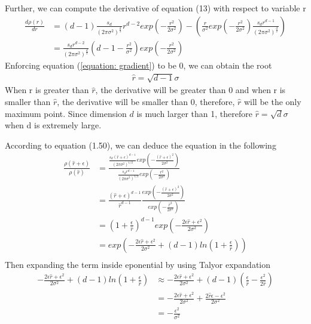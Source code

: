 \documentclass{article} %
\begin{document}
Further, we can compute the derivative of equation (13) with respect to variable r
\begin{equation}
    \begin{split}
    \frac{d\rho(r)}{d r} &= (d-1)\frac{s_d}{(2\pi\sigma^2)^{\frac{d}{2}}}r^{d-2}exp(-\frac{r^2}{2\sigma^2})-(\frac{r}{\sigma^2}exp(-\frac{r^2}{2\sigma^2})\frac{s_d r^{d-1}}{(2\pi\sigma^2)^{\frac{d}{2}}})\\
    &=\frac{s_d r^{d-2}}{(2\pi\sigma^2)^{\frac{d}{2}}}(d-1-\frac{r^2}{\sigma^2})exp(-\frac{r^2}{2\sigma^2})
    \end{split}
    \label{equation: gradient}
\end{equation}
Enforcing equation (\ref{equation: gradient}) to be 0, we can obtain the root
\begin{equation}
\begin{split}
    \hat{r} = \sqrt{d-1}\sigma
\end{split}
\end{equation}
When r is greater than $\hat{r}$, the derivative will be greater than 0 and when r is smaller than $\hat{r}$, the derivative will be smaller than 0, therefore, $\hat{r}$ will be the only maximum point.
Since dimension $d$ is much larger than 1, therefore $\hat{r}=\sqrt{d}\sigma$ when d is extremely large.
\par
According to equation (1.50), we can deduce the equation in the following
\begin{equation}
\begin{split}
    \frac{\rho(\hat{r}+\epsilon)}{\rho(\hat{r})}
    & = \frac{\frac{s_{d}(\hat{r}+\epsilon)^{d-1}}{(2\pi\sigma^2)^{1/2}}exp(-\frac{(\hat{r}+\epsilon)^2}{2\sigma^2})}{\frac{s_{d}r^{d-1}}{(2\pi\sigma^2)^{1/2}}exp(-\frac{r^2}{2\sigma^2})} \\
    &= \frac{(\hat{r}+\epsilon)^{d-1}}{\hat{r}^{d-1}}\frac{exp(-\frac{(\hat{r}+\epsilon)^2}{2\sigma^2})}{exp(-\frac{\hat{r}^2}{2\sigma^2})} \\
    &=(1+\frac{\epsilon}{\hat{r}})^{d-1}exp(-\frac{2\epsilon\hat{r}+\epsilon^2}{2\sigma^2})\\
    &=exp(-\frac{2\epsilon\hat{r}+\epsilon^2}{2\sigma^2}+(d-1)ln(1+\frac{\epsilon}{\hat{r}}))\\
\end{split}
\end{equation}
Then expanding the term inside eponential by using Talyor expandation
\begin{equation}
    \begin{split}
    -\frac{2\epsilon\hat{r}+\epsilon^2}{2\sigma^2}+(d-1)ln(1+\frac{\epsilon}{\hat{r}})&\approx-\frac{2\epsilon\hat{r}+\epsilon^2}{2\sigma^2}+(d-1)(\frac{\epsilon}{\hat{r}}-\frac{\epsilon^2}{2\hat{r}})\\
    &=-\frac{2\epsilon\hat{r}+\epsilon^2}{2\sigma^2}+\frac{2\hat{r}\epsilon-\epsilon^2}{2\sigma^2}\\
    &=-\frac{\epsilon^2}{\sigma^2}
    \end{split}
\end{equation}
\end{document}
